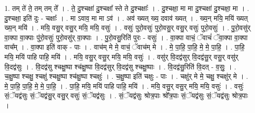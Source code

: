 \documentclass[17pt]{extarticle}
\begin{document}
1. तम् ते॑ ते॒ तम् तम् ते᳚ । . ते॒ दु॒श्चक्षा॑ दु॒श्चक्षा᳚ स्ते ते दु॒श्चक्षाः᳚ । . दु॒श्चक्षा॒ मा मा दु॒श्चक्षा॑ दु॒श्चक्षा॒ मा । . दु॒श्चक्षा॒ इति॑ दुः - चक्षाः᳚ । . मा ऽवाव॒ मा मा ऽव॑ । . अव॑ ख्यत् ख्य॒ दवाव॑ ख्यत् । . ख्य॒न् मयि॒ मयि॑ ख्यत् ख्य॒न् मयि॑ । . मयि॒ वसु॒र् वसु॒र् मयि॒ मयि॒ वसुः॑ । . वसुः॑ पुरो॒वसुः॑ पुरो॒वसु॒र् वसु॒र् वसुः॑ पुरो॒वसुः॑ । . पु॒रो॒वसु॑र् वा॒क्पा वा॒क्पाः पु॑रो॒वसुः॑ पुरो॒वसु॑र् वा॒क्पाः । . पु॒रो॒वसु॒रिति॑ पुरः - वसुः॑ । . वा॒क्पा वाचं॒ ॅवाचं॑ ॅवा॒क्पा वा॒क्पा वाच᳚म् । . वा॒क्पा इति॑ वाक् - पाः । . वाच॑म् मे मे॒ वाचं॒ ॅवाच॑म् मे । . मे॒ पा॒हि॒ पा॒हि॒ मे॒ मे॒ पा॒हि॒ । . पा॒हि॒ मयि॒ मयि॑ पाहि पाहि॒ मयि॑ । . मयि॒ वसु॒र् वसु॒र् मयि॒ मयि॒ वसुः॑ । . वसु॑र् वि॒दद्व॑सुर् वि॒दद्व॑सु॒र् वसु॒र् वसु॑र् वि॒दद्व॑सुः । . वि॒दद्व॑सु श्चक्षु॒ष्पा श्च॑क्षु॒ष्पा वि॒दद्व॑सुर् वि॒दद्व॑सु श्चक्षु॒ष्पाः । . वि॒दद्व॑सु॒रिति॑ वि॒दत् - व॒सुः॒ । . च॒क्षु॒ष्पा श्चक्षु॒ श्चक्षु॑ श्चक्षु॒ष्पा श्च॑क्षु॒ष्पा श्चक्षुः॑ । . च॒क्षु॒ष्पा इति॑ चक्षुः - पाः । . चक्षु॑र् मे मे॒ चक्षु॒ श्चक्षु॑र् मे । . मे॒ पा॒हि॒ पा॒हि॒ मे॒ मे॒ पा॒हि॒ । . पा॒हि॒ मयि॒ मयि॑ पाहि पाहि॒ मयि॑ । . मयि॒ वसु॒र् वसु॒र् मयि॒ मयि॒ वसुः॑ । . वसुः॑ सं॒ॅयद्व॑सुः सं॒ॅयद्व॑सु॒र् वसु॒र् वसुः॑ सं॒ॅयद्व॑सुः । . सं॒ॅयद्व॑सुः श्रोत्र॒पाः श्रो᳚त्र॒पाः सं॒ॅयद्व॑सुः सं॒ॅयद्व॑सुः श्रोत्र॒पाः । \newline
\end{document}
